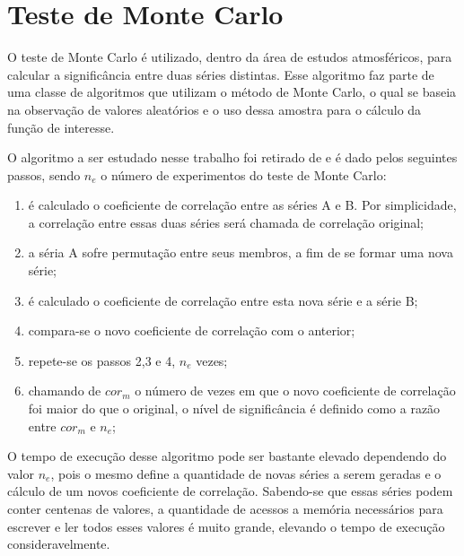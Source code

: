 \section{Teste de Monte Carlo}

O teste de Monte Carlo é utilizado, dentro da área de estudos atmosféricos, para calcular a significância entre duas séries distintas. Esse algoritmo faz parte de uma classe de algoritmos que utilizam o método de Monte Carlo, o qual se baseia na observação de valores aleatórios e o uso dessa amostra para o cálculo da função de interesse.

O algoritmo a ser estudado nesse trabalho foi retirado de \cite{Joao:2010} e é dado pelos seguintes passos, sendo $n_{e}$ o número de experimentos do teste de Monte Carlo:

\begin{enumerate}
\item  é calculado o coeficiente de correlação entre as séries A e B. Por simplicidade, a correlação entre essas duas séries será chamada de correlação original;

\item  a séria A sofre permutação entre seus membros, a fim de se formar uma nova série;

\item  é calculado o coeficiente de correlação entre esta nova série e a série B;

\item  compara-se o novo coeficiente de correlação com o anterior;

\item  repete-se os passos 2,3 e 4, $n_{e}$ vezes;

\item  chamando de $cor_{m}$ o número de vezes em que o novo coeficiente de correlação foi maior do que o original, o nível de significância é definido como a razão entre $cor_{m}$ e $n_{e}$;
\end{enumerate}

O tempo de execução desse algoritmo pode ser bastante elevado dependendo do valor $n_{e}$, pois o mesmo define a quantidade de novas séries a serem geradas e o cálculo de um novos coeficiente de correlação. Sabendo-se que essas séries podem conter centenas de valores, a quantidade de acessos a memória necessários para escrever e ler todos esses valores é muito grande, elevando o tempo de execução consideravelmente.